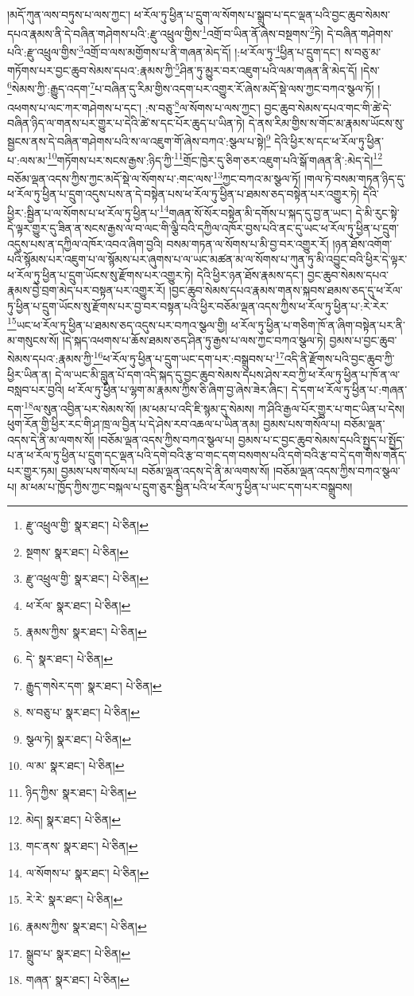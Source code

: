 །མདོ་ཀུན་ལས་བཏུས་པ་ལས་ཀྱང་། ཕ་རོལ་ཏུ་ཕྱིན་པ་དྲུག་ལ་སོགས་པ་སྒྲུབ་པ་དང་ལྡན་པའི་བྱང་ཆུབ་སེམས་དཔའ་རྣམས་ནི་དེ་བཞིན་གཤེགས་པའི་:རྫུ་འཕྲུལ་གྱིས་\footnote{རྫུ་འཕྲུལ་གྱི་  སྣར་ཐང་།  པེ་ཅིན། }འགྲོ་བ་ཡིན་ནོ་ཞེས་བསྔགས་\footnote{སྔགས་  སྣར་ཐང་།  པེ་ཅིན། }ཏེ། དེ་བཞིན་གཤེགས་པའི་:རྫུ་འཕྲུལ་གྱིས་\footnote{རྫུ་འཕྲུལ་གྱི་  སྣར་ཐང་།  པེ་ཅིན། }འགྲོ་བ་ལས་མགྱོགས་པ་ནི་གཞན་མེད་དོ། །:ཕ་རོལ་ཏུ་\footnote{ཕ་རོལ་  སྣར་ཐང་།  པེ་ཅིན། }ཕྱིན་པ་དྲུག་དང་། ས་བཅུ་མ་གཏོགས་པར་བྱང་ཆུབ་སེམས་དཔའ་:རྣམས་ཀྱི་\footnote{རྣམས་ཀྱིས་  སྣར་ཐང་།  པེ་ཅིན། }ཤིན་ཏུ་མྱུར་བར་འཇུག་པའི་ལམ་གཞན་ནི་མེད་དོ། །དེས་\footnote{དེ་  སྣར་ཐང་།  པེ་ཅིན། }སེམས་ཀྱི་:རྒྱུད་འདག་\footnote{རྒྱུད་གསེར་དག་  སྣར་ཐང་།  པེ་ཅིན། }པ་བཞིན་དུ་རིམ་གྱིས་འདག་པར་འགྱུར་རོ་ཞེས་མདོ་སྡེ་ལས་ཀྱང་བཀའ་སྩལ་ཏོ། །འཕགས་པ་ལང་ཀར་གཤེགས་པ་དང་། :ས་བཅུ་\footnote{ས་བཅུ་པ་  སྣར་ཐང་།  པེ་ཅིན། }ལ་སོགས་པ་ལས་ཀྱང་། བྱང་ཆུབ་སེམས་དཔའ་གང་གི་ཚེ་དེ་བཞིན་ཉིད་ལ་གནས་པར་གྱུར་པ་དེའི་ཚེ་ས་དང་པོར་ཆུད་པ་ཡིན་ཏེ། དེ་ནས་རིམ་གྱིས་ས་གོང་མ་རྣམས་ཡོངས་སུ་སྦྱངས་ནས་དེ་བཞིན་གཤེགས་པའི་ས་ལ་འཇུག་གོ་ཞེས་བཀའ་:སྩལ་པ་སྟེ།\footnote{སྩལ་ཏེ།  སྣར་ཐང་།  པེ་ཅིན། } དེའི་ཕྱིར་ས་དང་ཕ་རོལ་ཏུ་ཕྱིན་པ་:ལས་མ་\footnote{ལ་མ་  སྣར་ཐང་།  པེ་ཅིན། }གཏོགས་པར་སངས་རྒྱས་:ཉིད་ཀྱི་\footnote{ཉིད་ཀྱིས་  སྣར་ཐང་།  པེ་ཅིན། }གྲོང་ཁྱེར་དུ་ཅིག་ཅར་འཇུག་པའི་སྒོ་གཞན་ནི་:མེད་དེ།\footnote{མེད།  སྣར་ཐང་།  པེ་ཅིན། } བཅོམ་ལྡན་འདས་ཀྱིས་ཀྱང་མདོ་སྡེ་ལ་སོགས་པ་:གང་ལས་\footnote{གང་ནས་  སྣར་ཐང་།  པེ་ཅིན། }ཀྱང་བཀའ་མ་སྩལ་ཏོ། །གལ་ཏེ་བསམ་གཏན་ཉིད་དུ་ཕ་རོལ་ཏུ་ཕྱིན་པ་དྲུག་འདུས་པས་ན་དེ་བསྟེན་པས་ཕ་རོལ་ཏུ་ཕྱིན་པ་ཐམས་ཅད་བསྟེན་པར་འགྱུར་ཏེ། དེའི་ཕྱིར་:སྦྱིན་པ་ལ་སོགས་པ་ཕ་རོལ་ཏུ་ཕྱིན་པ་\footnote{ལ་སོགས་པ་  སྣར་ཐང་།  པེ་ཅིན། }གཞན་སོ་སོར་བསྟེན་མི་དགོས་པ་སྐད་དུ་བྱ་ན་ཡང་། དེ་མི་རུང་སྟེ་དེ་ལྟར་གྱུར་དུ་ཟིན་ན་སངས་རྒྱས་ལ་བ་ལང་གི་ལྕི་བའི་དཀྱིལ་འཁོར་བྱས་པའི་ནང་དུ་ཡང་ཕ་རོལ་ཏུ་ཕྱིན་པ་དྲུག་འདུས་པས་ན་དཀྱིལ་འཁོར་འབའ་ཞིག་བྱའི། བསམ་གཏན་ལ་སོགས་པ་མི་བྱ་བར་འགྱུར་རོ། །ཉན་ཐོས་འགོག་པའི་སྙོམས་པར་འཇུག་པ་ལ་སྙོམས་པར་ཞུགས་པ་ལ་ཡང་མཚན་མ་ལ་སོགས་པ་ཀུན་ཏུ་མི་འབྱུང་བའི་ཕྱིར་དེ་ལྟར་ཕ་རོལ་ཏུ་ཕྱིན་པ་དྲུག་ཡོངས་སུ་རྫོགས་པར་འགྱུར་ཏེ། དེའི་ཕྱིར་ཉན་ཐོས་རྣམས་དང་། བྱང་ཆུབ་སེམས་དཔའ་རྣམས་བྱེ་བྲག་མེད་པར་བསྟན་པར་འགྱུར་རོ། །བྱང་ཆུབ་སེམས་དཔའ་རྣམས་གནས་སྐབས་ཐམས་ཅད་དུ་ཕ་རོལ་ཏུ་ཕྱིན་པ་དྲུག་ཡོངས་སུ་རྫོགས་པར་བྱ་བར་བསྟན་པའི་ཕྱིར་བཅོམ་ལྡན་འདས་ཀྱིས་ཕ་རོལ་ཏུ་ཕྱིན་པ་:རེ་རེར་\footnote{རེ་རེ་  སྣར་ཐང་།  པེ་ཅིན། }ཡང་ཕ་རོལ་ཏུ་ཕྱིན་པ་ཐམས་ཅད་འདུས་པར་བཀའ་སྩལ་གྱི། ཕ་རོལ་ཏུ་ཕྱིན་པ་གཅིག་ཁོ་ན་ཞིག་བསྟེན་པར་ནི་མ་གསུངས་སོ། །དེ་སྐད་འཕགས་པ་ཆོས་ཐམས་ཅད་ཤིན་ཏུ་རྒྱས་པ་ལས་ཀྱང་བཀའ་སྩལ་ཏེ། བྱམས་པ་བྱང་ཆུབ་སེམས་དཔའ་:རྣམས་ཀྱི་\footnote{རྣམས་ཀྱིས་  སྣར་ཐང་།  པེ་ཅིན། }ཕ་རོལ་ཏུ་ཕྱིན་པ་དྲུག་ཡང་དག་པར་:བསྒྲུབས་པ་\footnote{སྒྲུབ་པ་  སྣར་ཐང་།  པེ་ཅིན། }འདི་ནི་རྫོགས་པའི་བྱང་ཆུབ་ཀྱི་ཕྱིར་ཡིན་ན། དེ་ལ་ཡང་མི་བླུན་པོ་དག་འདི་སྐད་དུ་བྱང་ཆུབ་སེམས་དཔས་ཤེས་རབ་ཀྱི་ཕ་རོལ་ཏུ་ཕྱིན་པ་ཁོ་ན་ལ་བསླབ་པར་བྱའི། ཕ་རོལ་ཏུ་ཕྱིན་པ་ལྷག་མ་རྣམས་ཀྱིས་ཅི་ཞིག་བྱ་ཞེས་ཟེར་ཞིང་། དེ་དག་ཕ་རོལ་ཏུ་ཕྱིན་པ་:གཞན་དག་\footnote{གཞན་  སྣར་ཐང་།  པེ་ཅིན། }ལ་སུན་འབྱིན་པར་སེམས་སོ། །མ་ཕམ་པ་འདི་ཇི་སྙམ་དུ་སེམས། ཀ་ཤིའི་རྒྱལ་པོར་གྱུར་པ་གང་ཡིན་པ་དེས། ཕུག་རོན་གྱི་ཕྱིར་རང་གི་ཤ་ཁྲ་ལ་བྱིན་པ་དེ་ཤེས་རབ་འཆལ་པ་ཡིན་ནམ། བྱམས་པས་གསོལ་པ། བཅོམ་ལྡན་འདས་དེ་ནི་མ་ལགས་སོ། །བཅོམ་ལྡན་འདས་ཀྱིས་བཀའ་སྩལ་པ། བྱམས་པ་ང་བྱང་ཆུབ་སེམས་དཔའི་སྤྱད་པ་སྤྱོད་པ་ན་ཕ་རོལ་ཏུ་ཕྱིན་པ་དྲུག་དང་ལྡན་པའི་དགེ་བའི་རྩ་བ་གང་དག་བསགས་པའི་དགེ་བའི་རྩ་བ་དེ་དག་གིས་གནོད་པར་གྱུར་ཏམ། བྱམས་པས་གསོལ་པ། བཅོམ་ལྡན་འདས་དེ་ནི་མ་ལགས་སོ། །བཅོམ་ལྡན་འདས་ཀྱིས་བཀའ་སྩལ་པ། མ་ཕམ་པ་ཁྱོད་ཀྱིས་ཀྱང་བསྐལ་པ་དྲུག་ཅུར་སྦྱིན་པའི་ཕ་རོལ་ཏུ་ཕྱིན་པ་ཡང་དག་པར་བསྒྲུབས། 